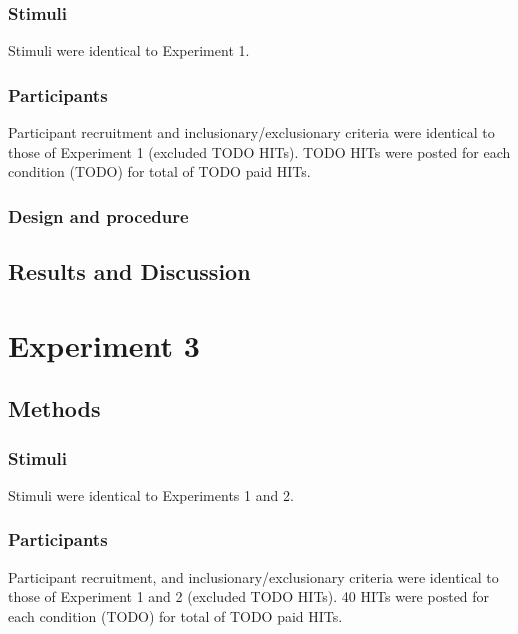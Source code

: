 \documentclass[10pt, letterpaper]{article}
\begin{document}
\subsubsection{Stimuli}\label{stimuli-2}

Stimuli were identical to Experiment 1.

\subsubsection{Participants}\label{participants-2}

Participant recruitment and inclusionary/exclusionary criteria were
identical to those of Experiment 1 (excluded TODO HITs). TODO HITs were
posted for each condition (TODO) for total of TODO paid HITs.

\subsubsection{Design and procedure}\label{design-and-procedure-2}

\subsection{Results and Discussion}\label{results-and-discussion-2}

\section{Experiment 3}\label{experiment-3}

\subsection{Methods}\label{methods-3}

\subsubsection{Stimuli}\label{stimuli-3}

Stimuli were identical to Experiments 1 and 2.

\subsubsection{Participants}\label{participants-3}

Participant recruitment, and inclusionary/exclusionary criteria were
identical to those of Experiment 1 and 2 (excluded TODO HITs). 40 HITs
were posted for each condition (TODO) for total of TODO paid HITs.
\end{document}
